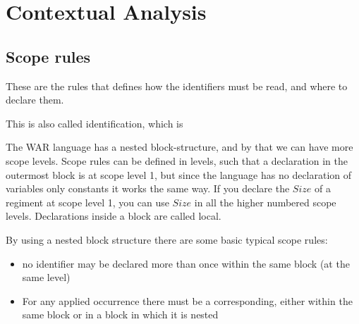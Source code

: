 \section{Contextual Analysis}

	\subsection{Scope rules}
	These are the rules that defines how the identifiers must be read, and where to declare them.
	
	This is also called identification, which is 
	
	
	
	
	
	
	
	The WAR language has a nested block-structure, and by that we can have more scope levels. 
	Scope rules can be defined in levels, such that a declaration in the outermost block is at scope level 1, but since the language has no declaration of variables only constants it works the same way. If you declare the $Size$ of a regiment at scope level 1, you can use $Size$ in all the higher numbered scope levels. Declarations inside a block are called local.
	

	By using a nested block structure there are some basic typical scope rules:



	\begin{itemize}
	\item no identifier may be declared more than once within the same block (at the same level) %
	\item For any applied occurrence there must be a corresponding, either within the same block or in a block in which it is nested %
	\end{itemize}
	
